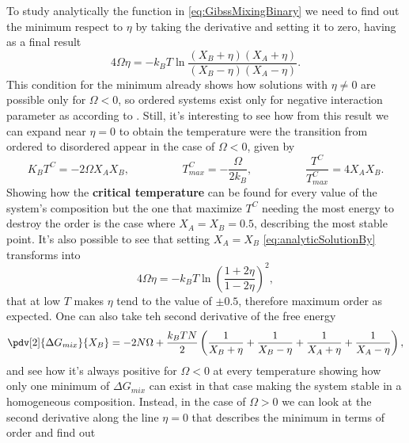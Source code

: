 {
    To study analytically the function in \eqref{eq:GibssMixingBinary} we need to find out the minimum respect to $\eta$ by taking the derivative and setting it to zero, having as a final result
    \begin{equation}
        \label{eq:analyticSolutionBy}
        4\Omega\eta = -k_BT\ln\frac{\left( X_B + \eta \right)\left( X_A + \eta \right)}{\left( X_B - \eta \right)\left( X_A - \eta \right)}.
    \end{equation}
    This condition for the minimum already shows how solutions with $\eta \neq 0$ are possible only for $\Omega < 0$, so ordered systems exist only for negative interaction parameter as according to . Still, it's interesting to see how from this result we can expand near $\eta = 0$ to obtain the temperature were the transition from ordered to disordered appear in the case of $\Omega < 0$, given by
    \begin{equation}
        K_BT^C = -2\Omega X_AX_B, \hspace{2cm} T^C_{max} = -\frac{\Omega}{2k_B}, \hspace{2cm} \frac{T^C}{T^C_{max}}=4X_AX_B.
    \end{equation}
    Showing how the \textbf{critical temperature} can be found for every value of the system's composition but the one that maximize $T^C$ needing the most energy to destroy the order is the case where $X_A = X_B = 0.5$, describing the most stable point. It's also possible to see that setting $X_A = X_B$ \eqref{eq:analyticSolutionBy} transforms into
    \begin{equation}
        4\Omega\eta = -k_BT\ln\left( \frac{1+2\eta}{1-2\eta} \right)^2,
    \end{equation}
    that at low $T$ makes $\eta$ tend to the value of $\pm 0.5$, therefore maximum order as expected. One can also take teh second derivative of the free energy
    \begin{equation}
        \pdv[2]{\Delta G_{mix}}{X_B} = -2N\Omega +\frac{k_BTN}{2}\left( \frac{1}{X_B + \eta} + \frac{1}{X_B - \eta} + \frac{1}{X_A + \eta} + \frac{1}{X_A - \eta} \right),
    \end{equation}
    and see how it's always positive for $\Omega < 0$ at every temperature showing how only one minimum of $\Delta G_{mix}$ can exist in that case making the system stable in a homogeneous composition. Instead, in the case of $\Omega > 0$ we can look at the second derivative along the line $\eta = 0$ that describes the minimum in terms of order and find out
}
